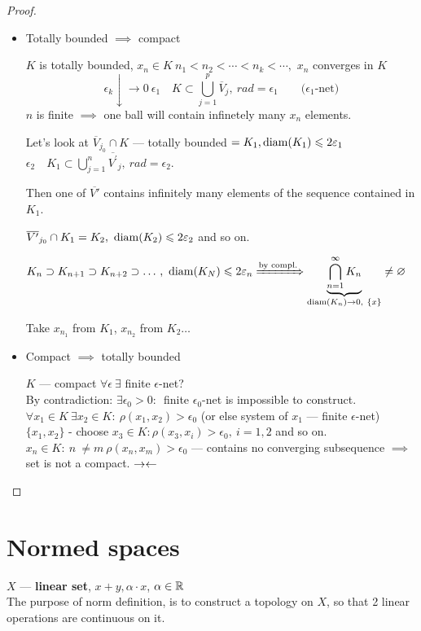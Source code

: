 \begin{proof}\leavevmode
  \begin{itemize}
    \item Totally bounded $\implies$ compact

      $K$ is totally bounded, $x_n \in K\ n_1 < n_2 < \dotsb < n_k < \dotsb,$
      $x_n$ converges in $K$
      \[\epsilon_k \downarrow \to 0\ \epsilon_1 \quad K \subset \bigcup\limits_{j = 1}^p \overline{V}_j,\ rad = \epsilon_1\qquad \text{($\epsilon_1$-net)} \]
      $n$ is finite $\implies$ one ball will contain infinetely many $x_n$ elements.

      Let's look at $\overline{V}_{j_0} \cap K$ --- totally bounded $= K_1, \operatorname{diam}({K_1}) \leqslant 2\varepsilon_1$ \\
      $\epsilon_2\quad K_1 \subset \bigcup\limits_{j =1}^n
      \overline{V^{'}}_{j},\ rad = \epsilon_2.$

      Then one of $\overline{V'}$ contains infinitely many elements of the sequence contained in $K_1$.

      $\overline{V'}_{j_0} \cap K_1 = K_2,\ \diam{K_2} \leq 2\epsilon_2$ and so on.

      $K_n \supset K_{n+1} \supset K_{n+2} \supset \dotso,\ \operatorname{diam}({K_N}) \leqslant 2\varepsilon_n
      \xRightarrow{\text{by compl.}} \underbrace{\bigcap\limits_{n = 1}^\infty K_n}_{\operatorname{diam}({K_n}) \to 0,\ \{x\}} \neq \varnothing$

      Take $x_{n_1}$ from $K_1$, $x_{n_2}$ from $K_2 \dotso$
    \item Compact $\implies$ totally bounded

      $K$ --- compact $\forall \epsilon\ \exists$ finite $\epsilon$-net? \\
      By contradiction: $\exists\epsilon_0 > 0\colon$\ finite $\epsilon_0$-net is impossible to construct. \\
    $\forall x_1 \in K\ \exists x_2 \in K \colon\ \rho(x_1, x_2) > \epsilon_0$ (or else system of $x_1$ --- finite $\epsilon$-net) \\
    $\{x_1, x_2\}$ - choose $x_3 \in K\colon \rho(x_3, x_i) > \epsilon_0,\ i = 1, 2$ and so on. \\
    $x_n \in K:\ n\ \neq m\ \rho(x_n, x_m) > \epsilon_0$ --- contains no converging subsequence $\implies$
    set is not a compact. $\rightarrow\leftarrow$ \qedhere
  \end{itemize}
\end{proof}

\section{Normed spaces}
\begin{defn}
  $X$ --- \textbf{linear set}, $x + y, \alpha \cdot x$, $\alpha \in \mathbb{R}$ \\
  The purpose of norm definition, is to construct a topology on $X$, so that 2 linear operations are continuous on it.
\end{defn}

